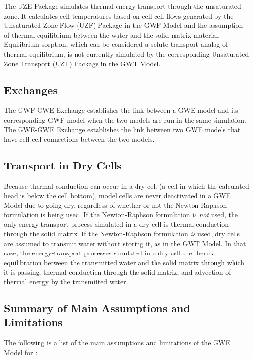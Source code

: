 {The UZE Package simulates thermal energy transport through the unsaturated zone. It calculates cell temperatures based on cell-cell flows generated by the Unsaturated Zone Flow (UZF) Package in the GWF Model and the assumption of thermal equilibrium between the water and the solid matrix material. Equilibrium sorption, which can be considered a solute-transport analog of thermal equilibrium, is not currently simulated by the corresponding Unsaturated Zone Transport (UZT) Package in the GWT Model.

\subsection{Exchanges}

The GWF-GWE Exchange establishes the link between a GWE model and its corresponding GWF model when the two models are run in the same simulation. The GWE-GWE Exchange establishes the link between two GWE models that have cell-cell connections between the two models.

\subsection{Transport in Dry Cells}

Because thermal conduction can occur in a dry cell (a cell in which the calculated head is below the cell bottom), model cells are never deactivated in a GWE Model due to going dry, regardless of whether or not the Newton-Raphson formulation is being used. If the Newton-Raphson formulation is \textit{not} used, the only energy-transport process simulated in a dry cell is thermal conduction through the solid matrix. If the Newton-Raphson formulation \textit{is} used, dry cells are assumed to transmit water without storing it, as in the GWT Model. In that case, the energy-transport processes simulated in a dry cell are thermal equilibration between the transmitted water and the solid matrix through which it is passing, thermal conduction through the solid matrix, and advection of thermal energy by the transmitted water.

\subsection{Summary of Main Assumptions and Limitations}

The following is a list of the main assumptions and limitations of the GWE Model for \mf:

}
